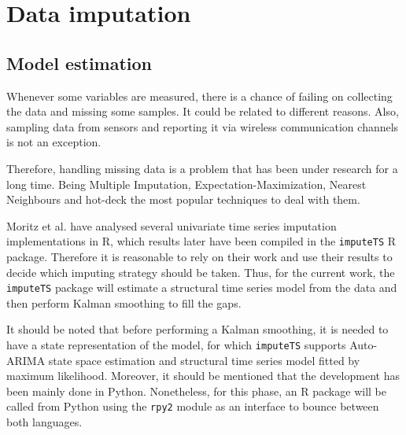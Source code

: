 
\chapter{Data imputation}
\label{ch:data-imputation}

\section{Model estimation}

Whenever some variables are measured, there is a chance of failing on collecting the data and missing some samples. It could be related to different reasons. %
Also, sampling data from sensors and reporting it via wireless communication channels is not an exception.

Therefore, handling missing data is a problem that has been under research for a long time. Being Multiple Imputation\cite{imputationRubin}, Expectation-Maximization\cite{imputationEM}, Nearest Neighbours\cite{imputationNN} and hot-deck\cite{imputationHotDeck} the most popular techniques to deal with them.


Moritz et al. have analysed several univariate time series imputation implementations in R\cite{MoritzComparison}, which results later have been compiled in the \texttt{imputeTS} R package\cite{imputeTS}. Therefore it is reasonable to rely on their work and use their results to decide which imputing strategy should be taken.
Thus, for the current work, the \texttt{imputeTS} package will estimate a structural time series model from the data and then perform Kalman smoothing to fill the gaps. 

It should be noted that before performing a Kalman smoothing, it is needed to have a state representation of the model, for which \texttt{imputeTS} supports Auto-ARIMA state space estimation and structural time series model fitted by maximum likelihood. Moreover, it should be mentioned that the development has been mainly done in Python. Nonetheless, for this phase, an R package will be called from Python using the \texttt{rpy2} module as an interface to bounce between both languages.

